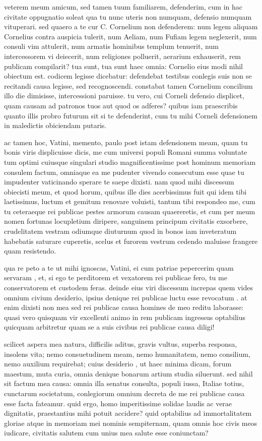  veterem meum amicum, sed tamen tuum familiarem, defenderim, cum in hac civitate oppugnatio soleat qua tu nunc uteris non numquam, defensio numquam vituperari. sed quaero a te cur C. Cornelium non defenderem: num legem aliquam Cornelius contra auspicia tulerit, num Aeliam, num Fufiam legem neglexerit, num consuli vim attulerit, num armatis hominibus templum tenuerit, num intercessorem vi deiecerit, num religiones polluerit, aerarium exhauserit, rem publicam compilarit? tua sunt, tua sunt haec omnia: Cornelio eius modi nihil obiectum est. codicem legisse dicebatur: defendebat testibus conlegis suis non se recitandi causa legisse, sed recognoscendi. constabat tamen Cornelium concilium illo die dimisisse, intercessioni paruisse. tu vero, cui Corneli defensio displicet, quam causam ad patronos tuos aut quod os adferes? quibus iam praescribis quanto illis probro futurum sit si te defenderint, cum tu mihi Corneli defensionem in maledictis obiciendam putaris.

 ac tamen hoc, Vatini, memento, paulo post istam defensionem meam, quam tu bonis viris displicuisse dicis, me cum universi populi Romani summa voluntate tum optimi cuiusque singulari studio magnificentissime post hominum memoriam consulem factum, omniaque ea me pudenter vivendo consecutum esse quae tu impudenter vaticinando sperare te saepe dixisti. nam quod mihi discessum obiecisti meum, et quod horum, quibus ille dies acerbissimus fuit qui idem tibi laetissimus, luctum et gemitum renovare voluisti, tantum tibi respondeo me, cum tu ceteraeque rei publicae pestes armorum causam quaereretis, et cum per meum nomen fortunas locupletium diripere, sanguinem principum civitatis exsorbere, crudelitatem vestram odiumque diuturnum quod in bonos iam inveteratum habebatis saturare cuperetis, scelus et furorem vestrum cedendo maluisse frangere quam resistendo.

 qua re peto a te ut mihi ignoscas, Vatini, ei cum patriae pepercerim quam servaram , et, si ego te perditorem et vexatorem rei publicae fero, tu me conservatorem et custodem feras. deinde eius viri discessum increpas quem vides omnium civium desiderio, ipsius denique rei publicae luctu esse revocatum . at enim dixisti non mea sed rei publicae causa homines de meo reditu laborasse: quasi vero quisquam vir excellenti animo in rem publicam ingressus optabilius quicquam arbitretur quam se a suis civibus rei publicae causa diligi!

 scilicet aspera mea natura, difficilis aditus, gravis vultus, superba responsa, insolens vita; nemo consuetudinem meam, nemo humanitatem, nemo consilium, nemo auxilium requirebat; cuius desiderio , ut haec minima dicam, forum maestum, muta curia, omnia denique bonarum artium studia siluerunt. sed nihil sit factum mea causa: omnia illa senatus consulta, populi iussa, Italiae totius, cunctarum societatum, conlegiorum omnium decreta de me rei publicae causa esse facta fateamur. quid ergo, homo imperitissime solidae laudis ac verae dignitatis, praestantius mihi potuit accidere? quid optabilius ad immortalitatem gloriae atque in memoriam mei nominis sempiternam, quam omnis hoc civis meos iudicare, civitatis salutem cum unius mea salute esse coniunctam?

